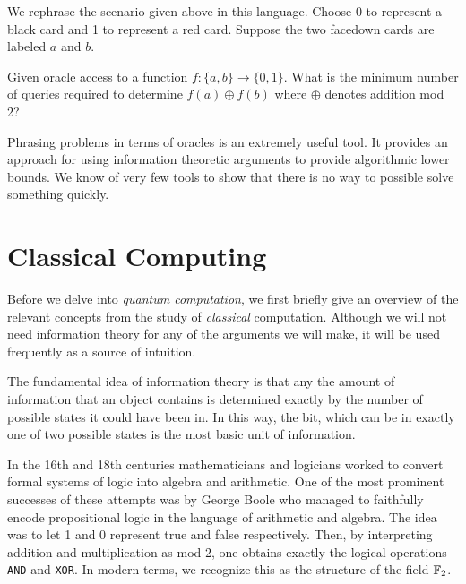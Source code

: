         We rephrase the scenario given above in this language.  Choose 0 to represent a black card and 1 to
        represent a red card. Suppose the two facedown cards are labeled $a$ and $b$.   
       
        \begin{example} 
            Given oracle access to a function $f: \{a, b\} \rightarrow \{0, 1\}$. What is the minimum number of
            queries required to determine $f(a) \oplus f(b)$ where $\oplus$ denotes addition mod 2?
        \end{example}
        

        Phrasing problems in terms of oracles is an extremely useful tool. It provides an approach for using 
        information theoretic arguments to provide algorithmic lower bounds. We know of very few tools to show that 
        there is no way to possible solve something quickly.

        \begin{example}
        \end{example}
        

\section{Classical Computing}
    
        Before we delve into  \emph{quantum computation}, we first briefly give an overview of the relevant 
        concepts from the study of \emph{classical} computation. Although we will not need information theory for 
        any of the arguments we will make, it will be used frequently as a source of intuition.

        The fundamental idea of information theory is that any the amount of information that an object contains is 
        determined exactly by the number of possible states it could have been in. In this way, the bit, which can 
        be in exactly one of two possible states is the most basic unit of information.


        In the 16th and 18th centuries mathematicians and logicians worked to convert formal systems of logic into 
        algebra and arithmetic. One of the most prominent successes of these attempts was by George Boole who 
        managed to faithfully encode propositional logic in the language of arithmetic and algebra. The idea was to 
        let 1 and 0 represent true and false respectively. Then, by interpreting addition and multiplication as mod 
        2, one obtains exactly the logical operations \texttt{AND} and  \texttt{XOR}. In modern terms, we recognize 
        this as the structure of the field $\mathbb{F}_2$. 


